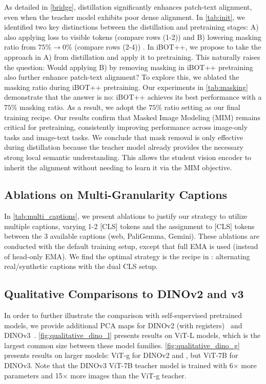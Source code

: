 As detailed in \cref{bridge}, distillation significantly enhances patch-text alignment, even when the teacher model exhibits poor dense alignment.
In \cref{tab:init}, we identified two key distinctions between the distillation and pretraining stages: A) also applying loss to visible tokens (compare rows (1-2)) and B) lowering masking ratio from  $75\% \rightarrow 0\%$ (compare rows (2-4)) .
In iBOT++, we propose to take the approach in A) from distillation and apply it to pretraining. 
This naturally raises the question: Would applying B) by removing masking in iBOT++ pretraining also further enhance patch-text alignment?
To explore this, we ablated the masking ratio during iBOT++ pretraining. 
Our experiments in \cref{tab:masking} demonstrate that the answer is no: iBOT++ achieves its best performance with a $75\%$ masking ratio.
As a result, we adopt the $75\%$ ratio setting as our final \tipsvtwo training recipe.
Our results confirm that Masked Image Modeling (MIM) remains critical for pretraining, consistently improving performance across image-only tasks and image-text tasks. We conclude that mask removal is only effective during distillation because the teacher model already provides the necessary strong local semantic understanding. This allows the student vision encoder to inherit the alignment without needing to learn it via the MIM objective.

\subsection{Ablations on Multi-Granularity Captions}

In \cref{tab:multi_captions}, we present ablations to justify our strategy to utilize multiple captions, varying 1-2 [CLS] tokens and the assignment to [CLS] tokens between the 3 available captions (web, PaliGemma, Gemini).
These ablations are conducted with the default \tipsvtwo training setup, except that full EMA is used (instead of head-only EMA).
We find the optimal strategy is the recipe in \tipsvtwo: alternating real/synthetic captions with the dual CLS setup.



\subsection{Qualitative Comparisons to DINOv2 and v3}

In order to further illustrate the comparison with self-supervised pretrained models, we provide additional PCA maps for DINOv2 (with registers)~\cite{vitsneedregisters,oquab2024dinov2} and DINOv3~\citep{siméoni2025dinov3}.
\cref{fig:qualitative_dino_l} presents results on ViT-L models, which is the largest common size between these model families. 
\cref{fig:qualitative_dino_g} presents results on larger models: ViT-g for DINOv2 and \tipsvtwo, but ViT-7B for DINOv3.
Note that the DINOv3 ViT-7B teacher model is trained with 6$\times$ more parameters and 15$\times$ more images than the \tipsvtwo ViT-g teacher.

